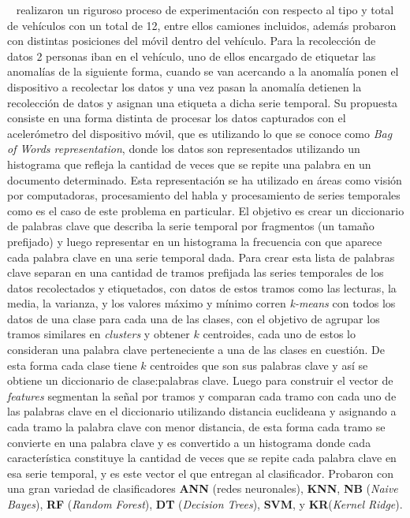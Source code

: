 ~\cite{gonzalez2017learning} realizaron un riguroso proceso de experimentación con respecto al tipo y total de vehículos con un total de 12, entre ellos camiones incluidos,
además probaron con distintas posiciones del móvil dentro del vehículo. Para la recolección de datos 2 personas iban en el vehículo, uno de ellos encargado de etiquetar las
anomalías de la siguiente forma, cuando se van acercando a la anomalía ponen el dispositivo a recolectar los datos y una vez pasan la anomalía detienen la recolección de datos
y asignan una etiqueta a dicha serie temporal. Su propuesta consiste en una forma distinta de procesar los datos capturados con el acelerómetro del dispositivo móvil, que es
utilizando lo que se conoce como \emph{Bag of Words representation}, donde los datos son representados utilizando un histograma que refleja la cantidad de veces que se repite
una palabra en un documento determinado. Esta representación se ha utilizado en áreas como visión por computadoras, procesamiento del habla y procesamiento de series temporales
como es el caso de este problema en particular. El objetivo es crear un diccionario de palabras clave que describa la serie temporal por fragmentos (un tamaño prefijado) y luego
representar en un histograma la frecuencia con que aparece cada palabra clave en una serie temporal dada. Para crear esta lista de palabras clave separan en una cantidad de tramos 
prefijada las series temporales de los datos recolectados y etiquetados, con datos de estos tramos como las lecturas, la media, la varianza, y los valores máximo y mínimo corren
\emph{k-means} con todos los datos de una clase para cada una de las clases, con el objetivo de agrupar los tramos similares en \emph{clusters} y obtener $k$ centroides, cada uno
de estos lo consideran una palabra clave perteneciente a una de las clases en cuestión. De esta forma cada clase tiene $k$ centroides que son sus palabras clave y así se obtiene 
un diccionario de clase:palabras clave. Luego para construir el vector de \emph{features} segmentan la señal por tramos y comparan cada tramo con cada uno de las palabras clave 
en el diccionario utilizando distancia euclideana y asignando a cada tramo la palabra clave con menor distancia, de esta forma cada tramo se convierte en una palabra clave y es 
convertido a un histograma donde cada característica constituye la cantidad de veces que se repite cada palabra clave en esa serie temporal, y es este vector el que entregan al 
clasificador. Probaron con una gran variedad de clasificadores \textbf{ANN} (redes neuronales), \textbf{KNN}, \textbf{NB} (\emph{Naive Bayes}), \textbf{RF} (\emph{Random Forest}),
\textbf{DT} (\emph{Decision Trees}), \textbf{SVM}, y \textbf{KR}(\emph{Kernel Ridge}).
